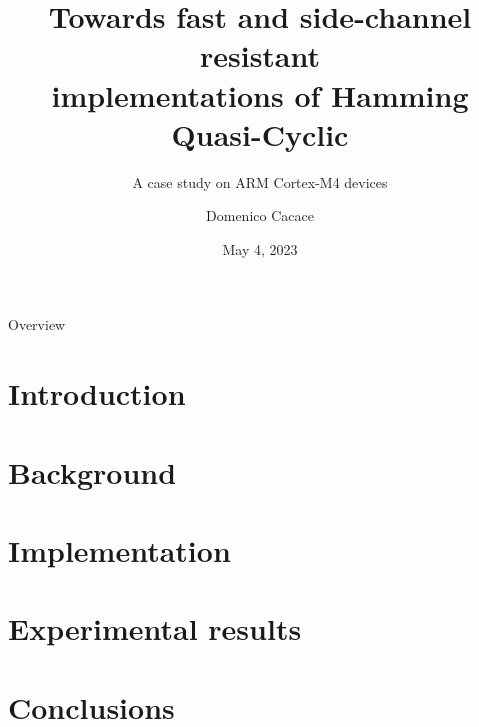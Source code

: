 \documentclass[tikz]{beamer}
\title{Towards fast and side-channel resistant\\implementations of Hamming Quasi-Cyclic}
\subtitle{A case study on ARM Cortex-M4 devices}
\author{Domenico Cacace}
\date{May 4, 2023}
\begin{document}
\begin{frame}
    \maketitle
\end{frame}

\begin{frame}{Overview}
\tableofcontents
\end{frame}

\section{Introduction}
\begin{frame}{}
    \sectionpage
\end{frame}


\section{Background}
\begin{frame}{}
    \sectionpage
\end{frame}


\section{Implementation}
\begin{frame}{}
    \sectionpage
\end{frame}


\section{Experimental results}
\begin{frame}{}
    \sectionpage
\end{frame}


\section{Conclusions}
\begin{frame}{}
    \sectionpage
\end{frame}

\end{document}
